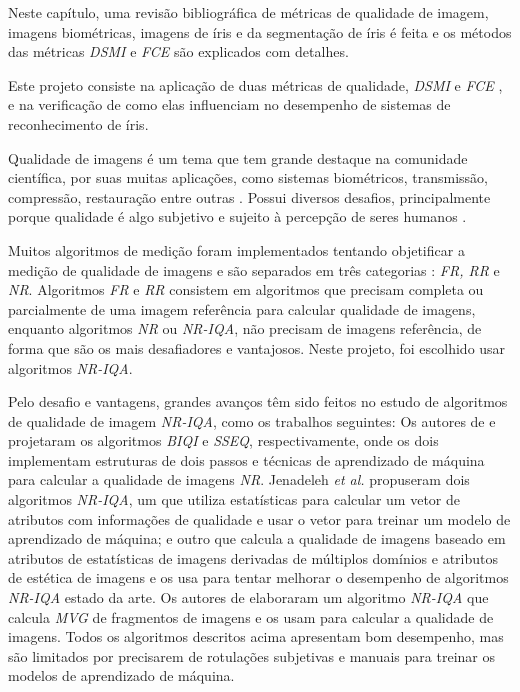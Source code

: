 
\par Neste capítulo, uma revisão bibliográfica de métricas de qualidade de imagem, imagens biométricas, imagens de íris e da segmentação de íris é feita e os métodos das métricas \textit{\acrfull{DSMI}} e \textit{\acrfull{FCE}} são explicados com detalhes.

\par Este projeto consiste na aplicação de duas métricas de qualidade, \textit{\acrshort{DSMI}} \cite{Jenadeleh_2018_CVPR_Workshops} e \textit{\acrshort{FCE}} \cite{du2010}, e na verificação de como elas influenciam no desempenho de sistemas de reconhecimento de íris.

\par Qualidade de imagens é um tema que tem grande destaque na comunidade científica, por suas muitas aplicações, como sistemas biométricos, transmissão, compressão, restauração entre outras \cite{zhang2015}. Possui diversos desafios, principalmente porque qualidade é algo subjetivo e sujeito à percepção de seres humanos \cite{xu2016}. 

\par Muitos algoritmos de medição foram implementados tentando objetificar a medição de qualidade de imagens e são separados em três categorias \cite{xu2016}: \textit{\acrfull{FR}, \acrfull{RR}} e \textit{\acrfull{NR}}. Algoritmos \textit{\acrshort{FR}} e \textit{RR} consistem em algoritmos que precisam completa ou parcialmente de uma imagem referência para calcular qualidade de imagens, enquanto algoritmos \textit{\acrshort{NR}} ou \textit{\acrfull{NR-IQA}}, não precisam de imagens referência, de forma que são os mais desafiadores e vantajosos. Neste projeto, foi escolhido usar algoritmos \textit{\acrshort{NR-IQA}}.

\par Pelo desafio e vantagens, grandes avanços têm sido feitos no estudo de algoritmos de qualidade de imagem \textit{\acrshort{NR-IQA}}, como os trabalhos seguintes: Os autores de \cite{moorthy2010} e \cite{liu2014} projetaram os algoritmos \textit{\acrfull{BIQI}} e \textit{\acrfull{SSEQ}}, respectivamente, onde os dois implementam estruturas de dois passos e técnicas de aprendizado de máquina para calcular a qualidade de imagens \textit{\acrshort{NR}}. Jenadeleh \textit{et al.} \cite{jenadeleh2016, jenadeleh2017} propuseram dois algoritmos \textit{\acrshort{NR-IQA}}, um que utiliza estatísticas para calcular um vetor de atributos com informações de qualidade e usar o vetor para treinar um modelo de aprendizado de máquina; e outro que calcula a qualidade de imagens baseado em atributos de estatísticas de imagens derivadas de múltiplos domínios e atributos de estética de imagens e os usa para tentar melhorar o desempenho de algoritmos \textit{\acrshort{NR-IQA}} estado da arte. Os autores de \cite{zhang2015} elaboraram um algoritmo \textit{\acrshort{NR-IQA}} que calcula \textit{\acrfull{MVG}} de fragmentos de imagens e os usam para calcular a qualidade de imagens. Todos os algoritmos descritos acima apresentam bom desempenho, mas são limitados por precisarem de rotulações subjetivas e manuais para treinar os modelos de aprendizado de máquina.

